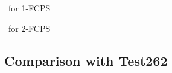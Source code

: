 
\todo\ for 1-FCPS

% 


\todo\ for 2-FCPS


\subsection{Comparison with Test262}\label{sec:compare-test262}

